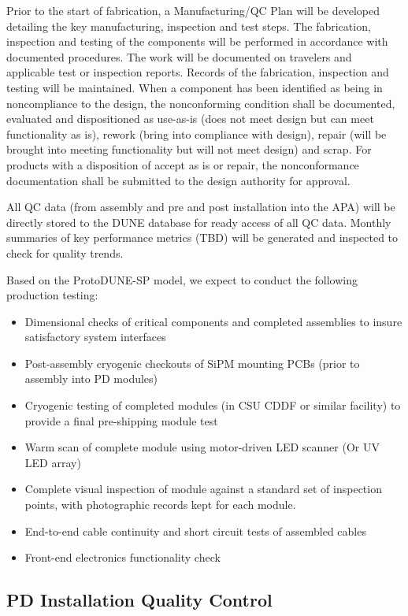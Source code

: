 Prior to the start of fabrication, a Manufacturing/QC Plan will be developed detailing the key manufacturing, inspection and test steps.  The fabrication, inspection and testing of the components will be performed in accordance with documented procedures. The work will be documented on travelers and applicable test or inspection reports. Records of the fabrication, inspection and testing will be maintained. When a component has been identified as being in noncompliance to the design, the nonconforming condition shall be documented, evaluated and dispositioned as use-as-is (does not meet design but can meet functionality as is), rework (bring into compliance with design), repair (will be brought into meeting functionality but will not meet design) and scrap. For products with a disposition of accept as is or repair, the nonconformance documentation shall be submitted to the design authority for approval.   

All QC data  (from assembly and pre and post installation into the APA) will be directly stored to the DUNE database for ready access of all QC data.  Monthly summaries of key performance metrics (TBD) will be generated and inspected to check for quality trends.

Based on the ProtoDUNE-SP model, we expect to conduct the following production testing:
\begin{itemize}
\item Dimensional checks of critical components and completed assemblies to insure satisfactory system interfaces
\item Post-assembly cryogenic checkouts of SiPM mounting PCBs (prior to assembly into PD modules)
\item Cryogenic testing of completed modules (in CSU CDDF or similar facility) to provide a final pre-shipping module test
\item Warm scan of complete module using motor-driven LED scanner (Or UV LED array)
\item Complete visual inspection of module against a standard set of inspection points, with photographic records kept for each module.
\item End-to-end cable continuity and short circuit tests of assembled cables
\item Front-end electronics functionality check
\end{itemize}

\subsection{PD Installation Quality Control}
\label{sec:fdsp-pd-prodqc}

